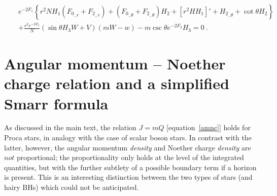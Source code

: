 \begin{eqnarray}
&&
e^{-2 {F_1}} \left\{r^2 N{H_1}( {F_0}_{,r}+ {F_2}_{,r})
+({F_0}_{,\theta} + {F_2}_{,\theta} ){H_2}
+[r^2 H  {H_1}]'
+ {H_2}_{,\theta}
+\cot \theta {H_2}
\right\}
 \nonumber \\
%
&&
+\frac{r^2e^{-2 {F_0}}}{N}
 (\sin \theta  {H_3} W+  V)(mW-w)
-{m} \csc \theta e^{-2 {F_2}} {H_3}=0 \ .
\end{eqnarray}


\section{Angular momentum -- Noether charge relation and 
a simplified Smarr formula}
\label{appendixc}
As discussed in the main text, the relation $J = m Q$ [equation~\eqref{amnc}] holds for Proca stars, in analogy with the case of scalar boson stars. In contrast with the latter, however, the angular momentum \textit{density} and Noether charge \textit{density} are $not$ proportional; the proportionality only holds at the level of the integrated quantities, but with the further subtlety of a possible boundary term if a horizon is present. This is an interesting distinction between the two types of stars (and hairy BHs) which could not be anticipated.

